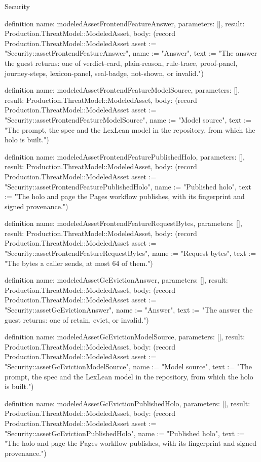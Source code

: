 \begin{lexlean}{Security}
\begin{semanticmodule}
definition{
  name: modeledAssetFrontendFeatureAnswer,
  parameters: [],
  result: Production.ThreatModel::ModeledAsset,
  body: (record Production.ThreatModel::ModeledAsset {asset := "Security::assetFrontendFeatureAnswer", name := "Answer", text := "The answer the guest returns: one of verdict-card, plain-reason, rule-trace, proof-panel, journey-steps, lexicon-panel, seal-badge, not-shown, or invalid."})
}

definition{
  name: modeledAssetFrontendFeatureModelSource,
  parameters: [],
  result: Production.ThreatModel::ModeledAsset,
  body: (record Production.ThreatModel::ModeledAsset {asset := "Security::assetFrontendFeatureModelSource", name := "Model source", text := "The prompt, the spec and the LexLean model in the repository, from which the holo is built."})
}

definition{
  name: modeledAssetFrontendFeaturePublishedHolo,
  parameters: [],
  result: Production.ThreatModel::ModeledAsset,
  body: (record Production.ThreatModel::ModeledAsset {asset := "Security::assetFrontendFeaturePublishedHolo", name := "Published holo", text := "The holo and page the Pages workflow publishes, with its fingerprint and signed provenance."})
}

definition{
  name: modeledAssetFrontendFeatureRequestBytes,
  parameters: [],
  result: Production.ThreatModel::ModeledAsset,
  body: (record Production.ThreatModel::ModeledAsset {asset := "Security::assetFrontendFeatureRequestBytes", name := "Request bytes", text := "The bytes a caller sends, at most 64 of them."})
}

definition{
  name: modeledAssetGcEvictionAnswer,
  parameters: [],
  result: Production.ThreatModel::ModeledAsset,
  body: (record Production.ThreatModel::ModeledAsset {asset := "Security::assetGcEvictionAnswer", name := "Answer", text := "The answer the guest returns: one of retain, evict, or invalid."})
}

definition{
  name: modeledAssetGcEvictionModelSource,
  parameters: [],
  result: Production.ThreatModel::ModeledAsset,
  body: (record Production.ThreatModel::ModeledAsset {asset := "Security::assetGcEvictionModelSource", name := "Model source", text := "The prompt, the spec and the LexLean model in the repository, from which the holo is built."})
}

definition{
  name: modeledAssetGcEvictionPublishedHolo,
  parameters: [],
  result: Production.ThreatModel::ModeledAsset,
  body: (record Production.ThreatModel::ModeledAsset {asset := "Security::assetGcEvictionPublishedHolo", name := "Published holo", text := "The holo and page the Pages workflow publishes, with its fingerprint and signed provenance."})
}


\end{semanticmodule}
\end{lexlean}
